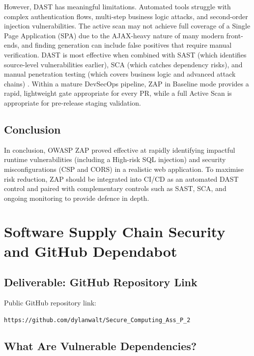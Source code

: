 \documentclass[12pt,a4paper]{article}
\begin{document}
However, DAST has meaningful limitations. Automated tools struggle with complex
authentication flows, multi-step business logic attacks, and second-order injection
vulnerabilities. The active scan may not achieve full coverage of a Single Page Application
(SPA) due to the AJAX-heavy nature of many modern front-ends, and finding generation can
include false positives that require manual verification. DAST is most effective when
combined with SAST (which identifies source-level vulnerabilities earlier), SCA (which
catches dependency risks), and manual penetration testing (which covers business logic and
advanced attack chains) \citep{shahin2017}. Within a mature DevSecOps pipeline, ZAP in
Baseline mode provides a rapid, lightweight gate appropriate for every PR, while a full
Active Scan is appropriate for pre-release staging validation.

\subsection{Conclusion}

In conclusion, OWASP ZAP proved effective at rapidly identifying impactful runtime
vulnerabilities (including a High-risk SQL injection) and security misconfigurations (CSP
and CORS) in a realistic web application. To maximise risk reduction, ZAP should be
integrated into CI/CD as an automated DAST control and paired with complementary controls
such as SAST, SCA, and ongoing monitoring to provide defence in depth.

\newpage

\section{Software Supply Chain Security and GitHub Dependabot}

\subsection{Deliverable: GitHub Repository Link}

Public GitHub repository link:
\begin{center}
\texttt{https://github.com/dylanwalt/Secure\_Computing\_Ass\_P\_2}
\end{center}

\subsection{What Are Vulnerable Dependencies?}
\end{document}

